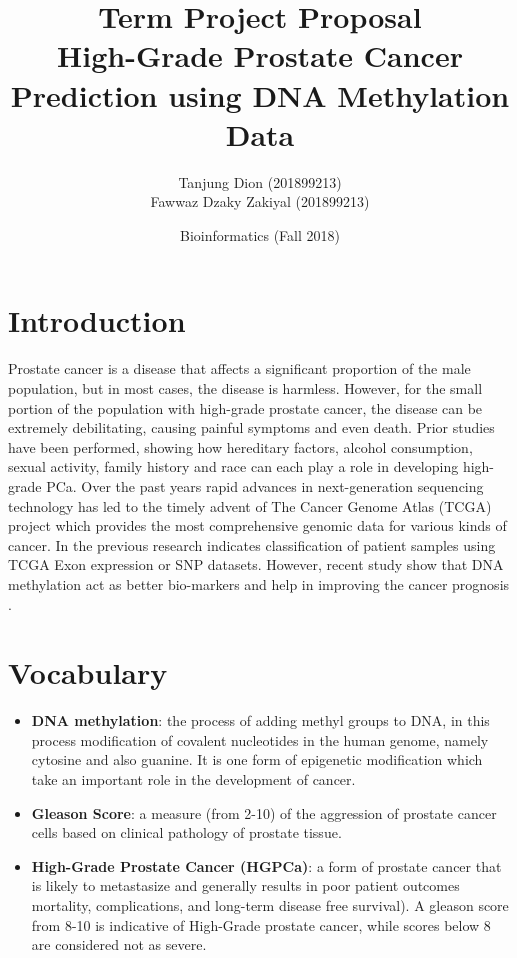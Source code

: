 \documentclass[a4paper,oneside]{article}
\begin{document}
\title{\vspace{-0.7in}Term Project Proposal\\
High-Grade Prostate Cancer Prediction using DNA Methylation Data}
\author{Tanjung Dion (201899213)\\Fawwaz Dzaky Zakiyal (201899213)\\}
\date{Bioinformatics (Fall 2018)}
\maketitle
 
\section{Introduction}
Prostate cancer is a disease that affects a significant proportion of the male population, but in most cases, the disease is harmless. However, for the small portion of the population with high-grade prostate cancer, the
disease can be extremely debilitating, causing painful symptoms and even death. Prior studies have been performed, showing how hereditary factors, alcohol consumption, sexual activity, family history and race can each play a role in developing high-grade PCa. Over the past years rapid advances in next-generation sequencing technology has led to the timely advent of The Cancer Genome Atlas (TCGA) project which provides the most comprehensive genomic data for various kinds of cancer. In the previous research indicates classification of patient samples using TCGA Exon expression or SNP datasets. However, recent study show that DNA methylation act as better bio-markers and help in improving the cancer prognosis \cite{one}.

\section{Vocabulary}
\begin{itemize}
\item \textbf{DNA methylation}: the process of adding methyl groups to DNA, in this process modification of covalent nucleotides in the human genome, namely cytosine and also guanine. It is one form of epigenetic modification which take an important role in the development of cancer.
\item \textbf{Gleason Score}: a measure (from 2-10) of the aggression of prostate cancer cells based on clinical pathology of prostate tissue.
\item \textbf{High-Grade Prostate Cancer (HGPCa)}: a form of prostate cancer that is likely to metastasize and generally results in poor patient outcomes mortality, complications, and long-term disease free survival). A gleason score from 8-10 is indicative of High-Grade prostate cancer, while scores below 8 are considered not as severe.
\end{itemize}
\end{document}
